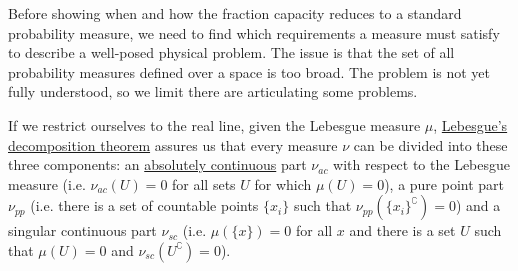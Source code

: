 Before showing when and how the fraction capacity reduces to a standard probability measure, we need to find which requirements a measure must satisfy to describe a well-posed physical problem. The issue is that the set of all probability measures defined over a space is too broad. The problem is not yet fully understood, so we limit there are articulating some problems.

If we restrict ourselves to the real line, given the Lebesgue measure $\mu$, \href{https://en.wikipedia.org/wiki/Lebesgue%27s_decomposition_theorem}{Lebesgue's decomposition theorem} assures us that every measure $\nu$ can be divided into these three components: an \href{https://en.wikipedia.org/wiki/Absolute_continuity#Absolute_continuity_of_measures}{absolutely continuous} part $\nu_{ac}$ with respect to the Lebesgue measure (i.e. $\nu_{ac}(U)=0$ for all sets $U$ for which $\mu(U)=0$), a pure point part $\nu_{pp}$ (i.e. there is a set of countable points $\{x_i\}$ such that $\nu_{pp}(\{x_i\}^{\complement})=0$) and a singular continuous part $\nu_{sc}$ (i.e. $\mu(\{x\})=0$ for all $x$ and there is a set $U$ such that $\mu(U)=0$ and $\nu_{sc}(U^{\complement})=0$).

